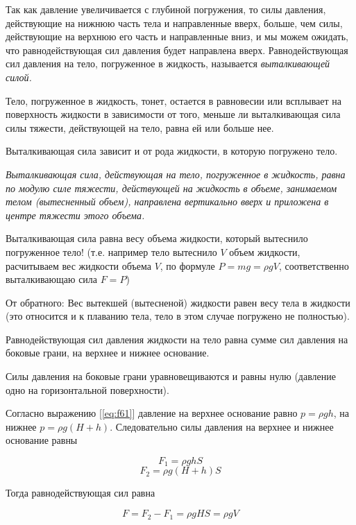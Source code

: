 \documentclass[a4paper,12pt]{article}
\begin{document}
		Так как давление увеличивается с глубиной погружения, то силы давления, действующие 
		на нижнюю часть тела и направленные вверх, больше, чем силы, действующие на верхнюю 
		его часть и направленные вниз, и мы можем ожидать, что равнодействующая сил давления 
		будет направлена вверх. Равнодействующая сил давления на тело, погруженное в жидкость,
		называется \textit{выталкивающей силой.}

		Тело, погруженное в жидкость, тонет, остается в равновесии или всплывает на поверхность
		жидкости в зависимости от того, меньше ли выталкивающая сила силы тяжести, действующей 
		на тело, равна ей или больше нее.

		Выталкивающая сила зависит и от рода жидкости, в которую погружено тело.

		\textit{Выталкивающая сила, действующая на тело, погруженное в жидкость, равна по модулю 
		силе тяжести, действующей на жидкость в объеме, занимаемом телом (вытесненный объем), 
		направлена вертикально вверх и приложена в центре тяжести этого объема.}
		
		Выталкивающая сила равна весу объема жидкости, который вытеснило погруженное тело!
		(т.е. например тело вытеснило $V$ объем жидкости, расчитываем вес жидкости объема $V$, 
		по формуле $P = mg = \rho g V$, соответственно выталкивающаю сила $F = P$)

		От обратного: Вес вытекшей (вытесненой) жидкости равен весу тела в жидкости 
		(это относится и к плаванию тела, тело в этом случае погружено не полностью).

		Равнодействующая сил давления жидкости на тело равна сумме сил давления на боковые
		грани, на верхнее и нижнее основание. 
		
		Силы давления на боковые грани уравновещиваются и равны нулю (давление одно на 
		горизонтальной поверхности).

		Согласно выражению [\ref{eq:f61}] давление на верхнее основание равно $p = \rho gh$,
		на нижнее $p = \rho g(H+h)$. Следовательно силы давления на верхнее и нижнее основание
		равны

		\begin{equation*}
			F_1 = \rho ghS
		\end{equation*}
		\begin{equation*}
			F_2 = \rho g(H+h)S
		\end{equation*}

		Тогда равнодействующая сил равна

		\begin{equation*}
			F = F_2-F_1 = \rho gHS = \rho gV
		\end{equation*}
\end{document}
